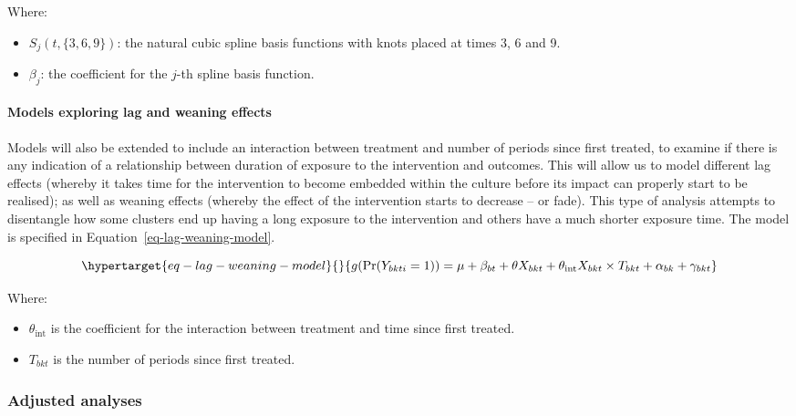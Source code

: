 \documentclass[
]{scrartcl}
\let\oldparagraph\paragraph
\renewcommand{\paragraph}[1]{\oldparagraph{#1}\mbox{}}
\providecommand{\tightlist}{%
  \setlength{\itemsep}{0pt}\setlength{\parskip}{0pt}}\usepackage{longtable,booktabs,array}
\begin{document}
Where:

\begin{itemize}
\tightlist
\item
  \(S_j(t, \{3, 6, 9\})\): the natural cubic spline basis functions with
  knots placed at times 3, 6 and 9.
\item
  \(\beta_j\): the coefficient for the \(j\)-th spline basis function.
\end{itemize}

\hypertarget{models-exploring-lag-and-weaning-effects}{%
\paragraph{Models exploring lag and weaning
effects}\label{models-exploring-lag-and-weaning-effects}}

Models will also be extended to include an interaction between treatment
and number of periods since first treated, to examine if there is any
indication of a relationship between duration of exposure to the
intervention and outcomes. This will allow us to model different lag
effects (whereby it takes time for the intervention to become embedded
within the culture before its impact can properly start to be realised);
as well as weaning effects (whereby the effect of the intervention
starts to decrease -- or fade). This type of analysis attempts to
disentangle how some clusters end up having a long exposure to the
intervention and others have a much shorter exposure time. The model is
specified in Equation~\ref{eq-lag-weaning-model}.

\begin{equation}\protect\hypertarget{eq-lag-weaning-model}{}{
g(\text{Pr}(Y_{bkti} = 1)) = \mu + \beta_{bt} + \theta X_{bkt} + \theta_{\text{int}} X_{bkt} \times T_{bkt} + \alpha_{bk} + \gamma_{bkt}
}\label{eq-lag-weaning-model}\end{equation}

Where:

\begin{itemize}
\tightlist
\item
  \(\theta_{\text{int}}\) is the coefficient for the interaction between
  treatment and time since first treated.
\item
  \(T_{bkt}\) is the number of periods since first treated.
\end{itemize}

\hypertarget{adjusted-analyses}{%
\subsubsection{Adjusted analyses}\label{adjusted-analyses}}
\end{document}
